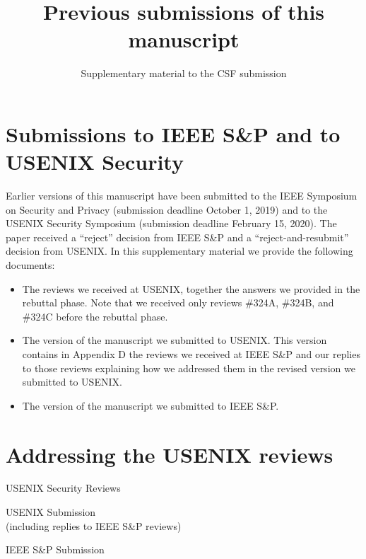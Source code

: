 \documentclass[a4paper]{scrartcl}
\title{Previous submissions of this manuscript}
\subtitle{Supplementary material to the CSF submission}
\date{}
\author{}
\begin{document}
  \maketitle

\section*{Submissions to IEEE S\&P and to USENIX Security}
Earlier versions of this manuscript have been submitted 
to the IEEE Symposium on Security and Privacy (submission deadline October 1, 2019)
and to the USENIX Security Symposium (submission deadline February 15, 2020).
The paper received a ``reject'' decision from IEEE S\&P and a ``reject-and-resubmit''
decision from USENIX. In this supplementary material we provide the following documents:
\begin{itemize}
  \item The reviews we received at USENIX, together the answers we provided
    in the rebuttal phase. Note that we received only reviews \#324A, \#324B, and \#324C
    before the rebuttal phase.
  \item The version of the manuscript we submitted to USENIX. This version
    contains in Appendix D the reviews we received at IEEE S\&P and our replies
    to those reviews explaining how we addressed them in the revised version
    we submitted to USENIX.
  \item The version of the manuscript we submitted to IEEE S\&P.
\end{itemize}


\section*{Addressing the USENIX reviews}

\newpage
\vspace*{7cm}
\begin{center}
  \textsf{
\Huge{USENIX Security Reviews}
}
\end{center}
\newpage









\newpage
\vspace*{7cm}
\begin{center}
  \textsf{
\Huge{USENIX Submission}\\
\large{(including replies to IEEE S\&P reviews)}
}
\end{center}
\newpage



\newpage
\vspace*{7cm}
\begin{center}
  \textsf{
\Huge{IEEE S\&P Submission}\\
}
\end{center}
\newpage


\end{document}
